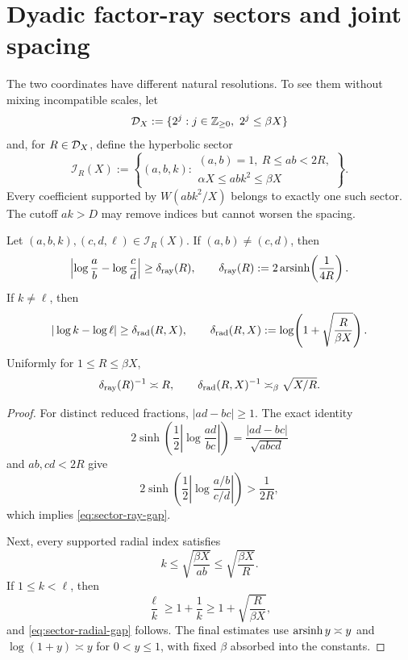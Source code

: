 \section{Dyadic factor-ray sectors and joint spacing}
\label{sec:sector-geometry}

The two coordinates have different natural resolutions.  To see them
without mixing incompatible scales, let
\begin{equation}
 \mathcal D_X:=\{2^j:j\in\mathbb Z_{\geq0},\ 2^j\leq\beta X\}
 \label{eq:dyadic-scales}
\end{equation}
and, for $R\in\mathcal D_X$, define the hyperbolic sector
\begin{equation}
 \mathscr I_R(X):=
 \left\{(a,b,k):
 \begin{array}{l}
 (a,b)=1,\ R\leq ab<2R,\\
 \alpha X\leq abk^2\leq\beta X
 \end{array}
 \right\}.
 \label{eq:sector-index-set}
\end{equation}
Every coefficient supported by $W(abk^2/X)$ belongs to exactly one such
sector.  The cutoff $ak>D$ may remove indices but cannot worsen the
spacing.

\begin{lemma}
\label{lem:sector-joint-gaps}
Let $(a,b,k),(c,d,\ell)\in\mathscr I_R(X)$.  If $(a,b)\ne(c,d)$, then
\begin{equation}
 \left|\log\frac ab-\log\frac cd\right|
 \geq\delta_{\rm ray}(R),
 \qquad
 \delta_{\rm ray}(R):=2\operatorname{arsinh}\!\left(\frac1{4R}\right).
 \label{eq:sector-ray-gap}
\end{equation}
If $k\ne\ell$, then
\begin{equation}
 |\log k-\log\ell|
 \geq\delta_{\rm rad}(R,X),
 \qquad
 \delta_{\rm rad}(R,X)
 :=\log\!\left(1+\sqrt{\frac{R}{\beta X}}\right).
 \label{eq:sector-radial-gap}
\end{equation}
Uniformly for $1\leq R\leq\beta X$,
\begin{equation}
 \delta_{\rm ray}(R)^{-1}\asymp R,
 \qquad
 \delta_{\rm rad}(R,X)^{-1}\asymp_\beta\sqrt{X/R}.
 \label{eq:sector-gap-scales}
\end{equation}
\end{lemma}

\begin{proof}
For distinct reduced fractions, $|ad-bc|\geq1$.  The exact identity
\[
 2\sinh\!\left(
 \frac12\left|\log\frac{ad}{bc}\right|
 \right)
 =\frac{|ad-bc|}{\sqrt{abcd}}
\]
and $ab,cd<2R$ give
\[
 2\sinh\!\left(
 \frac12\left|\log\frac{a/b}{c/d}\right|
 \right)>\frac1{2R},
\]
which implies \eqref{eq:sector-ray-gap}.

Next, every supported radial index satisfies
\[
 k\leq\sqrt{\frac{\beta X}{ab}}
 \leq\sqrt{\frac{\beta X}{R}}.
\]
If $1\leq k<\ell$, then
\[
 \frac\ell k\geq1+\frac1k
 \geq1+\sqrt{\frac{R}{\beta X}},
\]
and \eqref{eq:sector-radial-gap} follows.  The final estimates use
$\operatorname{arsinh} y\asymp y$ and $\log(1+y)\asymp y$ for $0<y\leq1$, with fixed
$\beta$ absorbed into the constants.
\end{proof}

